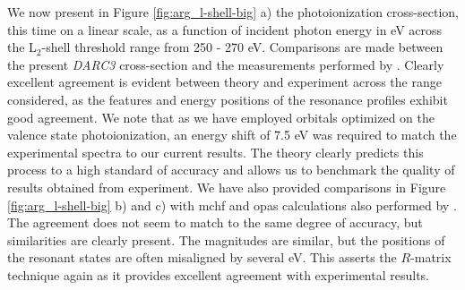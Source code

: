 We now present in Figure \ref{fig:arg_l-shell-big} a) the photoionization cross-section, this time on a linear scale, as a function of incident photon energy in eV across the L$_{2}$-shell threshold range from 250 - 270 eV. Comparisons are made between the present \textit{DARC3} cross-section and the measurements performed by \citet{2012PhRvA..85d3408B}. Clearly excellent agreement is evident between theory and experiment across the range considered, as the features and energy positions of the resonance profiles exhibit good agreement. We note that as we have employed orbitals optimized on the valence state photoionization, an energy shift of 7.5 eV was required to match the experimental spectra to our current results. The theory clearly predicts this process to a high standard of accuracy and allows us to benchmark the quality of results obtained from experiment. We have also provided comparisons in Figure \ref{fig:arg_l-shell-big} b) and c) with {\sc mchf} and {\sc opas} calculations also performed by \citet{2012PhRvA..85d3408B}. The agreement does not seem to match to the same degree of accuracy, but similarities are clearly present. The magnitudes are similar, but the positions of the resonant states are often misaligned by several eV. This asserts the $R$-matrix technique again as it provides excellent agreement with experimental results.

